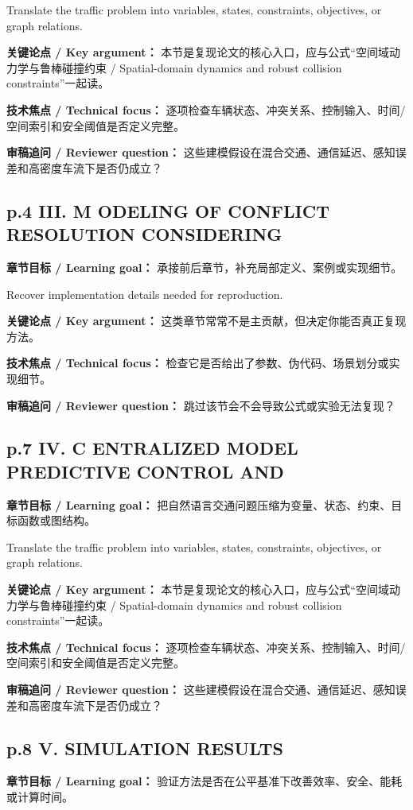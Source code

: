 \documentclass[UTF8,a4paper,11pt,fontset=fandol]{ctexart}
\begin{document}
Translate the traffic problem into variables, states, constraints, objectives, or graph relations.

\textbf{关键论点 / Key argument：} 本节是复现论文的核心入口，应与公式“空间域动力学与鲁棒碰撞约束 / Spatial-domain dynamics and robust collision constraints”一起读。

\textbf{技术焦点 / Technical focus：} 逐项检查车辆状态、冲突关系、控制输入、时间/空间索引和安全阈值是否定义完整。

\textbf{审稿追问 / Reviewer question：} 这些建模假设在混合交通、通信延迟、感知误差和高密度车流下是否仍成立？

\subsection*{p.4 III. M ODELING OF CONFLICT RESOLUTION CONSIDERING}
\textbf{章节目标 / Learning goal：} 承接前后章节，补充局部定义、案例或实现细节。

Recover implementation details needed for reproduction.

\textbf{关键论点 / Key argument：} 这类章节常常不是主贡献，但决定你能否真正复现方法。

\textbf{技术焦点 / Technical focus：} 检查它是否给出了参数、伪代码、场景划分或实现细节。

\textbf{审稿追问 / Reviewer question：} 跳过该节会不会导致公式或实验无法复现？

\subsection*{p.7 IV. C ENTRALIZED MODEL PREDICTIVE CONTROL AND}
\textbf{章节目标 / Learning goal：} 把自然语言交通问题压缩为变量、状态、约束、目标函数或图结构。

Translate the traffic problem into variables, states, constraints, objectives, or graph relations.

\textbf{关键论点 / Key argument：} 本节是复现论文的核心入口，应与公式“空间域动力学与鲁棒碰撞约束 / Spatial-domain dynamics and robust collision constraints”一起读。

\textbf{技术焦点 / Technical focus：} 逐项检查车辆状态、冲突关系、控制输入、时间/空间索引和安全阈值是否定义完整。

\textbf{审稿追问 / Reviewer question：} 这些建模假设在混合交通、通信延迟、感知误差和高密度车流下是否仍成立？

\subsection*{p.8 V. SIMULATION RESULTS}
\textbf{章节目标 / Learning goal：} 验证方法是否在公平基准下改善效率、安全、能耗或计算时间。
\end{document}

